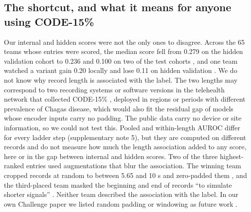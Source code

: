 \documentclass{iopjournal}
\begin{document}
\subsection{The shortcut, and what it means for anyone using CODE-15\%}
Our internal and hidden scores were not the only ones to disagree. Across the 65 teams whose entries were scored, the median score fell from 0.279 on the hidden validation cohort to 0.236 and 0.100 on two of the test cohorts \citep{reyna2025}, and one team watched a variant gain 0.20 locally and lose 0.11 on hidden validation \citep{wang2025}.
We do not know why record length is associated with the label. The two lengths may correspond to two recording systems or software versions in the telehealth network that collected CODE-15\% \citep{ribeiro2020}, deployed in regions or periods with different prevalence of Chagas disease, which would also fit the residual gap of models whose encoder inputs carry no padding. The public data carry no device or site information, so we could not test this. Pooled and within-length AUROC differ for every ladder step (supplementary note 5), but they are computed on different records and do not measure how much the length association added to any score, here or in the gap between internal and hidden scores. Two of the three highest-ranked entries used augmentations that blur the association. The winning team cropped records at random to between 5.65 and 10 s and zero-padded them \citep{vansantvliet2025}, and the third-placed team masked the beginning and end of records ``to simulate shorter signals'' \citep{hong2025}.
Neither team described the association with the label. In our own Challenge paper we listed random padding or windowing as future work \citep{nguyen2025}.
\end{document}
